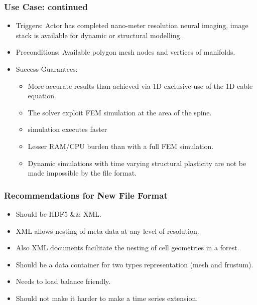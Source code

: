\documentclass[notes=hide]{beamer}
\begin{document}
{\begin{frame}
\frametitle{Use Case: continued}
\begin{itemize}
\vfill 
\item Triggers:
Actor has completed nano-meter resolution neural imaging, image stack is available for dynamic or structural modelling. 
\vfill
\item Preconditions:
Available polygon mesh nodes and vertices of manifolds.
\vfill
\item Success Guarantees:
\begin{itemize}
\item More accurate results than achieved via 1D exclusive use of the 1D cable equation. 
\item The solver exploit FEM simulation at the area of the spine.
\item simulation executes faster
\item Lesser RAM/CPU burden than with a full FEM simulation.
\item Dynamic simulations with time varying structural plasticity are not be made impossible by the file format.
\end{itemize}
\end{itemize}
\end{frame}


\begin{frame}
\frametitle{Recommendations for New File Format}
\begin{itemize}
\item Should be HDF5 \&\& XML.
\vfill
\item XML allows nesting of meta data at any level of resolution.
\vfill 
\item Also XML documents facilitate the nesting of cell geometries in a forest. 
\vfill
\item Should be a data container for two types representation (mesh and frustum).

\vfill
\item Needs to load balance friendly.
\vfill
\item Should not make it harder to make a time series extension. 
\end{itemize}
\end{frame}






   

}
\end{document}
